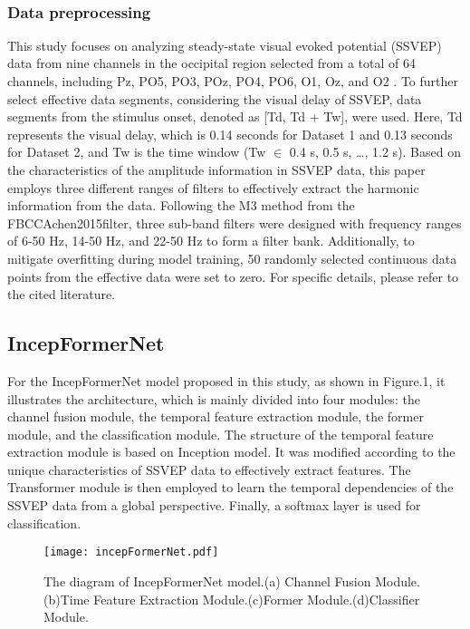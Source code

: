 \documentclass[10pt]{iopart}
\begin{document}
‌\subsubsection{Data preprocessing\\}
This study focuses on analyzing steady-state visual evoked potential (SSVEP) data from nine channels in the occipital region selected from a total of 64 channels, including Pz, PO5, PO3, POz, PO4, PO6, O1, Oz, and O2 \cite{wang2016benchmark}\cite{liu2020beta}. To further select effective data segments, considering the visual delay of SSVEP, data segments from the stimulus onset, denoted as [Td, Td + Tw], were used. Here, Td represents the visual delay, which is 0.14 seconds for Dataset 1 and 0.13 seconds for Dataset 2, and Tw is the time window (Tw $\in$ {0.4 s, 0.5 s, …, 1.2 s}). Based on the characteristics of the amplitude information in SSVEP data, this paper employs three different ranges of filters to effectively extract the harmonic information from the data. Following the M3 method from the FBCCAchen2015filter, three sub-band filters were designed with frequency ranges of 6-50 Hz, 14-50 Hz, and 22-50 Hz to form a filter bank. Additionally, to mitigate overfitting during model training, 50 randomly selected continuous data points from the effective data were set to zero. For specific details, please refer to the cited literature\cite{wolpaw2002brain}.
‌\subsection{IncepFormerNet}
For the IncepFormerNet model proposed in this study, as shown in Figure.1, it illustrates the architecture, which is mainly divided into four modules: the channel fusion module, the temporal feature extraction module, the former module, and the classification module. The structure of the temporal feature extraction module is based on Inception model. It was modified according to the unique characteristics of SSVEP data to effectively extract features. The Transformer module is then employed to learn the temporal dependencies of the SSVEP data from a global perspective. Finally, a softmax layer is used for classification.
\begin{figure*}[ht]
    \centering
    \texttt{[image: incepFormerNet.pdf]}
    \caption{The diagram of IncepFormerNet model.(a) Channel Fusion Module.(b)Time Feature Extraction Module.(c)Former Module.(d)Classifier Module.}
\end{figure*}
\end{document}
